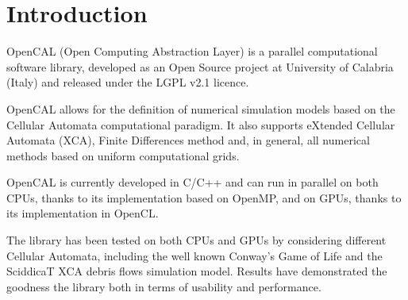 \chapter{Introduction}

OpenCAL (Open Computing Abstraction Layer) is a parallel computational
software library, developed as an Open Source project at University of
Calabria (Italy) and released under the LGPL v2.1 licence.

OpenCAL allows for the definition of numerical simulation models based
on the Cellular Automata computational paradigm. It also supports
eXtended Cellular Automata (XCA), Finite Differences method and, in
general, all numerical methods based on uniform computational grids.

OpenCAL is currently developed in C/C++ and can run in parallel on
both CPUs, thanks to its implementation based on OpenMP, and on GPUs,
thanks to its implementation in OpenCL.




The library has been tested on both CPUs and GPUs by considering
different Cellular Automata, including the well known Conway's Game of
Life and the SciddicaT XCA debris flows simulation model. Results have
demonstrated the goodness the library both in terms of usability and
performance.


